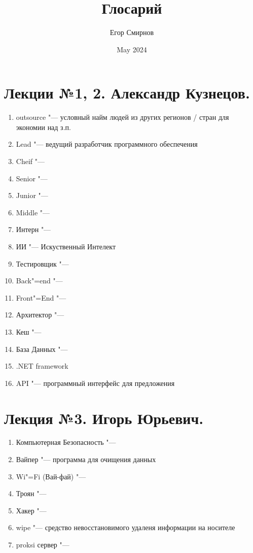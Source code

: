 \documentclass{article}
\title{Глосарий}
\author{Егор Смирнов}
\date{May 2024}
\begin{document}
\section{Лекции №1, 2. Александр Кузнецов.}
\begin{enumerate}
    \item outsource "--- условный найм людей из других регионов / стран для экономии над з.п.
    \item Lead "--- ведущий разработчик программного обеспечения
    \item Cheif "---
    \item Senior "---
    \item Junior "---
    \item Middle "---
    \item Интерн "---
    \item ИИ "--- Искуственный Интелект
    \item Тестировщик "---
    \item Back"=end "---
    \item Front"=End "---
    \item Архитектор "---
    \item Кеш "---
    \item База Данных "---
    \item .NET framework
    \item API "--- программный интерфейс для предложения
\end{enumerate}

\section{Лекция №3. Игорь Юрьевич.}
\begin{enumerate}
    \item Компьютерная Безопасность "---
    \item Вайпер "--- программа для очищения данных
    \item Wi"=Fi (Вай-фай) "---
    \item Троян "---
    \item Хакер "---
    \item wipe "--- средство невосстановимого удаленя информации на носителе
    \item proksi сервер "---
\end{enumerate}
\end{document}
